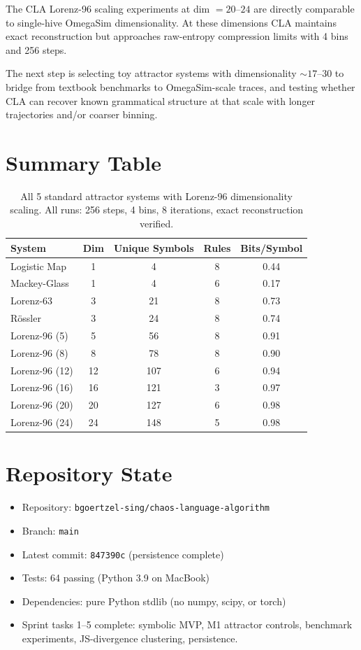 \documentclass[11pt]{article}
\begin{document}
The CLA Lorenz-96 scaling experiments at dim $= 20$--$24$ are directly
comparable to single-hive OmegaSim dimensionality. At these dimensions CLA
maintains exact reconstruction but approaches raw-entropy compression
limits with 4 bins and 256 steps.

The next step is selecting toy attractor systems with dimensionality
$\sim 17$--$30$ to bridge from textbook benchmarks to OmegaSim-scale
traces, and testing whether CLA can recover known grammatical structure
at that scale with longer trajectories and/or coarser binning.

\section{Summary Table}

\begin{table}[h]
\centering
\begin{tabular}{lcccc}
\toprule
System & Dim & Unique Symbols & Rules & Bits/Symbol \\
\midrule
Logistic Map   & 1  & 4   & 8 & 0.44 \\
Mackey-Glass   & 1  & 4   & 6 & 0.17 \\
Lorenz-63      & 3  & 21  & 8 & 0.73 \\
R\"ossler      & 3  & 24  & 8 & 0.74 \\
Lorenz-96 (5)  & 5  & 56  & 8 & 0.91 \\
Lorenz-96 (8)  & 8  & 78  & 8 & 0.90 \\
Lorenz-96 (12) & 12 & 107 & 6 & 0.94 \\
Lorenz-96 (16) & 16 & 121 & 3 & 0.97 \\
Lorenz-96 (20) & 20 & 127 & 6 & 0.98 \\
Lorenz-96 (24) & 24 & 148 & 5 & 0.98 \\
\bottomrule
\end{tabular}
\caption{All 5 standard attractor systems with Lorenz-96 dimensionality
scaling. All runs: 256 steps, 4 bins, 8 iterations, exact reconstruction
verified.}
\end{table}

\section{Repository State}

\begin{itemize}
\item Repository: \texttt{bgoertzel-sing/chaos-language-algorithm}
\item Branch: \texttt{main}
\item Latest commit: \texttt{847390c} (persistence complete)
\item Tests: 64 passing (Python 3.9 on MacBook)
\item Dependencies: pure Python stdlib (no numpy, scipy, or torch)
\item Sprint tasks 1--5 complete: symbolic MVP, M1 attractor controls,
benchmark experiments, JS-divergence clustering, persistence.
\end{itemize}
\end{document}
